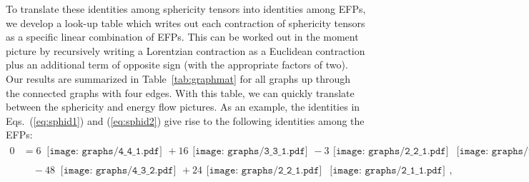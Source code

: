 \documentclass[aps,prd,floatfix,preprintnumbers,twocolumn,groupedaddress,nofootinbib,longbibliography,10pt]{revtex4-1}
\DeclareRobustCommand{\Tab}[1]{Table~\ref{#1}}
\DeclareRobustCommand{\Eqs}[2]{Eqs.~(\ref{#1}) and (\ref{#2})}
\begin{document}
To translate these identities among sphericity tensors  into identities among EFPs, we develop a look-up table which writes out each contraction of sphericity tensors as a specific linear combination of EFPs.
%
This can be worked out in the moment picture by recursively writing a Lorentzian contraction as a Euclidean contraction plus an additional term of opposite sign (with the appropriate factors of two).
%
Our results are summarized in \Tab{tab:graphmat} for all graphs up through the connected graphs with four edges.
%
With this table, we can quickly translate between the sphericity and energy flow pictures.
%
As an example, the identities in \Eqs{eq:sphid1}{eq:sphid2} give rise to the following identities among the EFPs:
%
\begin{align}
0 & = 6\, \begin{gathered}\texttt{[image: graphs/4\_4\_1.pdf]}\end{gathered}
+ 16 \begin{gathered}\texttt{[image: graphs/3\_3\_1.pdf]}\end{gathered}
-3 \begin{gathered}\texttt{[image: graphs/2\_2\_1.pdf]}\end{gathered}\begin{gathered}\texttt{[image: graphs/2\_2\_1.pdf]}\end{gathered}
\nonumber\\ &\quad - 48\, \begin{gathered}\texttt{[image: graphs/4\_3\_2.pdf]}\end{gathered}
+ 24 \begin{gathered}\texttt{[image: graphs/2\_2\_1.pdf]}\end{gathered} \begin{gathered}\texttt{[image: graphs/2\_1\_1.pdf]}\end{gathered}
 ,\label{eq:efpid1}
 \end{align}
\end{document}
